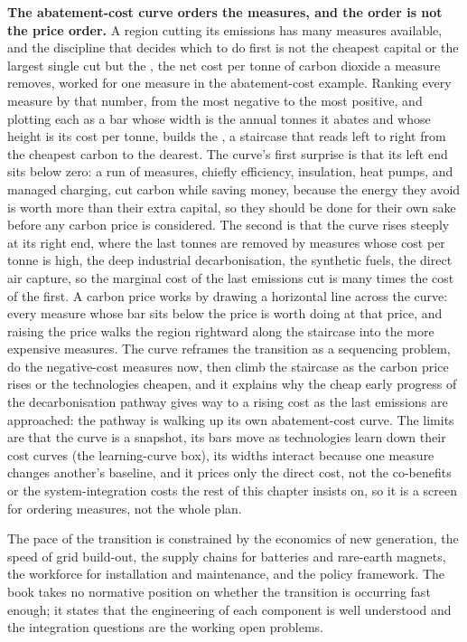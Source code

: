\begin{mastery}
\textbf{The abatement-cost curve orders the measures, and the order is not the
price order.} A region cutting its emissions has many measures available, and
the discipline that decides which to do first is not the cheapest capital or
the largest single cut but the , the net cost
per tonne of carbon dioxide a measure removes, worked for one measure in the
abatement-cost example. Ranking every measure by that number, from the most
negative to the most positive, and plotting each as a bar whose width is the
annual tonnes it abates and whose height is its cost per tonne, builds the
, a staircase that reads left to right
from the cheapest carbon to the dearest. The curve's first surprise is that its
left end sits below zero: a run of measures, chiefly efficiency, insulation,
heat pumps, and managed charging, cut carbon while saving money, because the
energy they avoid is worth more than their extra capital, so they should be
done for their own sake before any carbon price is considered. The second is
that the curve rises steeply at its right end, where the last tonnes are
removed by measures whose cost per tonne is high, the deep industrial
decarbonisation, the synthetic fuels, the direct air capture, so the marginal
cost of the last emissions cut is many times the cost of the first. A carbon
price works by drawing a horizontal line across the curve: every measure whose
bar sits below the price is worth doing at that price, and raising the price
walks the region rightward along the staircase into the more expensive
measures. The curve reframes the transition as a sequencing problem, do the
negative-cost measures now, then climb the staircase as the carbon price rises
or the technologies cheapen, and it explains why the cheap early progress of
the decarbonisation pathway gives way to a rising cost as the last emissions
are approached: the pathway is walking up its own abatement-cost curve. The
limits are that the curve is a snapshot, its bars move as technologies learn
down their cost curves (the learning-curve box), its widths interact because
one measure changes another's baseline, and it prices only the direct cost, not
the co-benefits or the system-integration costs the rest of this chapter
insists on, so it is a screen for ordering measures, not the whole plan.
\end{mastery}

The pace of the transition is constrained by the economics of new
generation, the speed of grid build-out, the supply chains for
batteries and rare-earth magnets, the workforce for installation and
maintenance, and the policy framework. The book takes no normative
position on whether the transition is occurring fast enough; it states
that the engineering of each component is well understood and the
integration questions are the working open problems.

